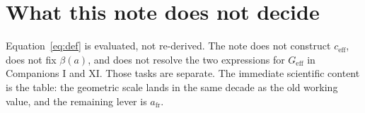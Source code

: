 \documentclass[11pt,a4paper]{article}
\begin{document}
\section{What this note does not decide}

Equation~\eqref{eq:def} is evaluated, not re-derived. The note does not
construct \(c_{\mathrm{eff}}\), does not fix \(\beta(a)\), and does not
resolve the two expressions for \(G_{\mathrm{eff}}\) in Companions I and XI.
Those tasks are separate. The immediate scientific content is the table:
the geometric scale lands in the same decade as the old working value, and
the remaining lever is \(a_{\mathrm{fr}}\).
\end{document}
